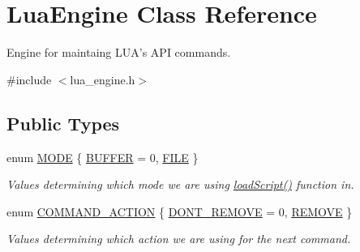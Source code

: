 \hypertarget{class_lua_engine}{\section{Lua\-Engine Class Reference}
\label{class_lua_engine}
}


Engine for maintaing L\-U\-A's A\-P\-I commands.  




{\ttfamily \#include $<$lua\-\_\-engine.\-h$>$}

\subsection*{Public Types}
\begin{DoxyCompactItemize}
\item 
enum \hyperlink{class_lua_engine_a70152f6f27278ec4262bd4712823a72d}{M\-O\-D\-E} \{ \hyperlink{class_lua_engine_a70152f6f27278ec4262bd4712823a72da483618369ed68950688dd6fa572664b9}{B\-U\-F\-F\-E\-R} =  0, 
\hyperlink{class_lua_engine_a70152f6f27278ec4262bd4712823a72daac87617557f4c3f7c559f1aed56a1645}{F\-I\-L\-E}
 \}
\begin{DoxyCompactList}\small\item\em Values determining which mode we are using \hyperlink{class_lua_engine_aab9337ae5ea59bccc1e08c4015d42700}{load\-Script()} function in. \end{DoxyCompactList}\item 
enum \hyperlink{class_lua_engine_a3410f0b2ab8ca7641b79653451490d90}{C\-O\-M\-M\-A\-N\-D\-\_\-\-A\-C\-T\-I\-O\-N} \{ \hyperlink{class_lua_engine_a3410f0b2ab8ca7641b79653451490d90aa7ee4ee2afa5c026aa8b6f709aec6242}{D\-O\-N\-T\-\_\-\-R\-E\-M\-O\-V\-E} =  0, 
\hyperlink{class_lua_engine_a3410f0b2ab8ca7641b79653451490d90a9c722598745ba82641ffd978d2ad6518}{R\-E\-M\-O\-V\-E}
 \}
\begin{DoxyCompactList}\small\item\em Values determining which action we are using for the next command. \end{DoxyCompactList}\end{DoxyCompactItemize}
